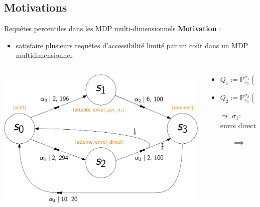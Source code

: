 \documentclass[compress]{beamer}
\theoremstyle{theorem}%
\begin{document}
\subsection{Motivations}
\begin{frame}{Requêtes percentiles dans les MDP multi-dimensionnels}
  \textbf{\color{fibeamer@orange}Motivation} :
  \begin{itemize}
    \item satisfaire plusieurs requêtes d'accessibilité limité par un coût dans
      un MDP multidimensionnel.
  \end{itemize}
  \begin{center}
    \begin{columns}
      \begin{column}{0.4\linewidth}
        \includegraphics[width=\linewidth]{resources/mdmdp2}
      \end{column}
      \begin{column}{0.6\linewidth}{\small
        \begin{itemize}
          \item $Q_1 := \mathbb{P}^{\sigma_1}_{s_0}(\Diamond_{1\, :\, \leq 4} \text{ sommeil}) \geq 0.8$
          \item $Q_2 := \mathbb{P}^{\sigma_2}_{s_0}(\Diamond_{2\, :\, \leq 700} \text{ sommeil}) \geq 0.9$
            \item[$\leadsto$] $\sigma_1 : $ envoi direct
            \begin{itemize}
              \item[$\implies$] 
            \end{itemize}

\end{itemize}}
\end{column}
\end{columns}
\end{center}
\end{frame}
\end{document}
